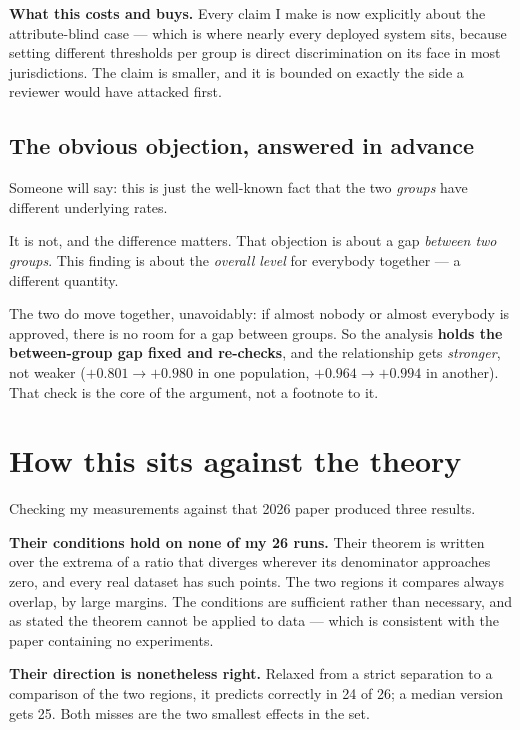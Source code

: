 \documentclass[11pt,a4paper]{article}
\begin{document}
\textbf{What this costs and buys.} Every claim I make is now explicitly about the
attribute-blind case --- which is where nearly every deployed system sits, because setting
different thresholds per group is direct discrimination on its face in most jurisdictions. The
claim is smaller, and it is bounded on exactly the side a reviewer would have attacked first.

\subsection{The obvious objection, answered in advance}

Someone will say: this is just the well-known fact that the two \emph{groups} have different
underlying rates.

It is not, and the difference matters. That objection is about a gap \emph{between two
groups}. This finding is about the \emph{overall level} for everybody together --- a
different quantity.

The two do move together, unavoidably: if almost nobody or almost everybody is approved,
there is no room for a gap between groups. So the analysis \textbf{holds the between-group
gap fixed and re-checks}, and the relationship gets \emph{stronger}, not weaker
($+0.801 \rightarrow +0.980$ in one population, $+0.964 \rightarrow +0.994$ in another).
That check is the core of the argument, not a footnote to it.

\section{How this sits against the theory}

Checking my measurements against that 2026 paper produced three results.

\textbf{Their conditions hold on none of my 26 runs.} Their theorem is written over the
extrema of a ratio that diverges wherever its denominator approaches zero, and every real
dataset has such points. The two regions it compares always overlap, by large margins. The
conditions are sufficient rather than necessary, and as stated the theorem cannot be applied
to data --- which is consistent with the paper containing no experiments.

\textbf{Their direction is nonetheless right.} Relaxed from a strict separation to a
comparison of the two regions, it predicts correctly in 24 of 26; a median version gets 25.
Both misses are the two smallest effects in the set.
\end{document}
